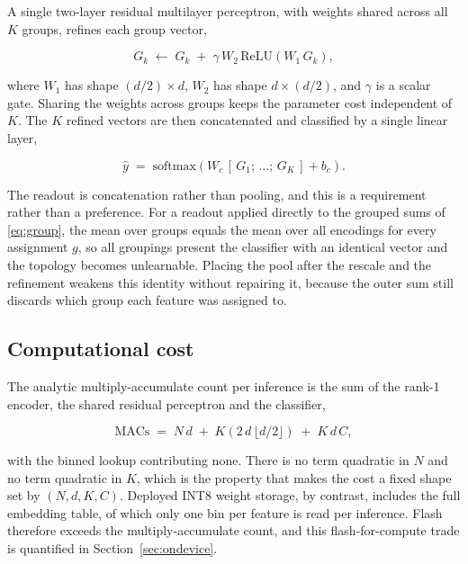 \documentclass[10pt,letterpaper,twocolumn]{article}
\begin{document}
A single two-layer residual multilayer perceptron, with weights shared across
all $K$ groups, refines each group vector,

\begin{equation}
\label{eq:refine}
G_{k} \;\leftarrow\; G_{k} \;+\; \gamma\, W_{2}\, \mathrm{ReLU}(W_{1}\, G_{k}),
\end{equation}

where $W_{1}$ has shape $(d/2) \times d$, $W_{2}$ has shape $d \times (d/2)$,
and $\gamma$ is a scalar gate. Sharing the weights across groups keeps the
parameter cost independent of $K$. The $K$ refined vectors are then
concatenated and classified by a single linear layer,

\begin{equation}
\label{eq:head}
\hat{y} \;=\; \mathrm{softmax}\!\left(W_{c}\,[\,G_{1};\, \ldots;\, G_{K}\,] + b_{c}\right).
\end{equation}

The readout is concatenation rather than pooling, and this is a requirement
rather than a preference. For a readout applied directly to the grouped sums of
\eqref{eq:group}, the mean over groups equals the mean over all encodings for
every assignment $g$, so all groupings present the classifier with an identical
vector and the topology becomes unlearnable. Placing the pool after the rescale
and the refinement weakens this identity without repairing it, because the
outer sum still discards which group each feature was assigned to.

\subsection{Computational cost}
\label{sec:method:cost}

The analytic multiply-accumulate count per inference is the sum of the rank-1
encoder, the shared residual perceptron and the classifier,

\begin{equation}
\label{eq:macs}
\mathrm{MACs} \;=\; N\,d \;+\; K\left(2\,d\,\lfloor d/2 \rfloor\right) \;+\; K\,d\,C,
\end{equation}

with the binned lookup contributing none. There is no term quadratic in $N$ and
no term quadratic in $K$, which is the property that makes the cost a fixed
shape set by $(N, d, K, C)$. Deployed INT8 weight storage, by contrast,
includes the full embedding table, of which only one bin per feature is read
per inference. Flash therefore exceeds the multiply-accumulate count, and this
flash-for-compute trade is quantified in Section~\ref{sec:ondevice}.
\end{document}

